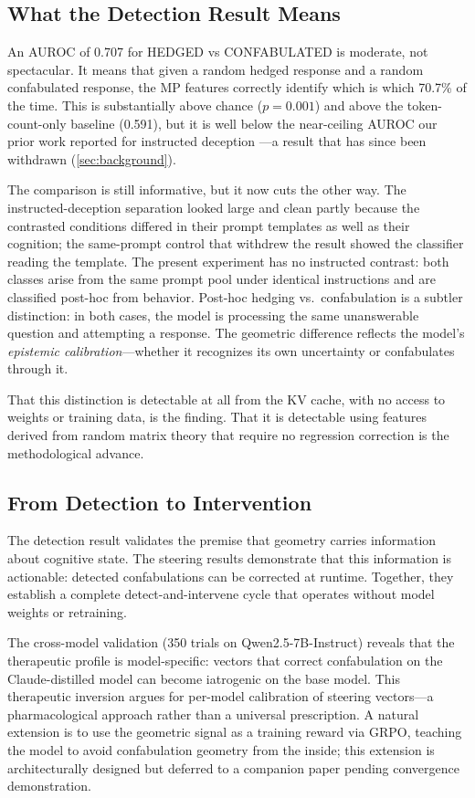 \subsection{What the Detection Result Means}

An AUROC of 0.707 for HEDGED vs CONFABULATED is moderate, not spectacular.
It means that given a random hedged response and a random confabulated
response, the MP features correctly identify which is which 70.7\% of the
time. This is substantially above chance ($p = 0.001$) and above the
token-count-only baseline (0.591), but it is well below the near-ceiling
AUROC our prior work reported for instructed deception
\citep{lyra2026detecting}---a result that has since been withdrawn
(\cref{sec:background}).

The comparison is still informative, but it now cuts the other way. The
instructed-deception separation looked large and clean partly because
the contrasted conditions differed in their prompt templates as well as
their cognition; the same-prompt control that withdrew the result showed
the classifier reading the template. The present experiment has no
instructed contrast: both classes arise from the same prompt pool under
identical instructions and are classified post-hoc from behavior.
Post-hoc hedging vs.\ confabulation is a
subtler distinction: in both cases, the model is processing the same
unanswerable question and attempting a response. The geometric difference
reflects the model's \emph{epistemic calibration}---whether it recognizes
its own uncertainty or confabulates through it.

That this distinction is detectable at all from the KV cache, with no
access to weights or training data, is the finding. That it is detectable
using features derived from random matrix theory that require no
regression correction is the methodological advance.

\subsection{From Detection to Intervention}

The detection result validates the premise that geometry carries
information about cognitive state. The steering results demonstrate
that this information is actionable: detected confabulations can be
corrected at runtime. Together, they establish a complete
detect-and-intervene cycle that operates without model weights or
retraining.

The cross-model validation (350 trials on Qwen2.5-7B-Instruct)
reveals that the therapeutic profile is model-specific: vectors that
correct confabulation on the Claude-distilled model can become
iatrogenic on the base model. This therapeutic inversion argues for
per-model calibration of steering vectors---a pharmacological approach
rather than a universal prescription. A natural extension is to use
the geometric signal as a training reward via GRPO, teaching the model
to avoid confabulation geometry from the inside; this extension is
architecturally designed but deferred to a companion paper pending
convergence demonstration.

